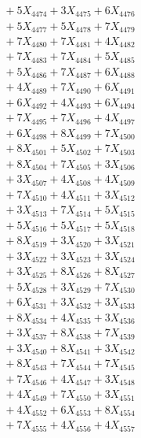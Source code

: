 \documentclass[a4paper,10pt]{article}
\begin{document}
{\begin{align}
&\;  + 5 X_{4474} + 3 X_{4475} + 6 X_{4476} \\[0.3ex]
&\;  + 5 X_{4477} + 5 X_{4478} + 7 X_{4479} \\[0.5ex]\allowbreak
&\;  + 7 X_{4480} + 7 X_{4481} + 4 X_{4482} \\[0.3ex]
&\;  + 7 X_{4483} + 7 X_{4484} + 5 X_{4485} \\[0.3ex]
&\;  + 5 X_{4486} + 7 X_{4487} + 6 X_{4488} \\[0.3ex]
&\;  + 4 X_{4489} + 7 X_{4490} + 6 X_{4491} \\[0.3ex]
&\;  + 6 X_{4492} + 4 X_{4493} + 6 X_{4494} \\[0.3ex]
&\;  + 7 X_{4495} + 7 X_{4496} + 4 X_{4497} \\[0.3ex]
&\;  + 6 X_{4498} + 8 X_{4499} + 7 X_{4500} \\[0.3ex]
&\;  + 8 X_{4501} + 5 X_{4502} + 7 X_{4503} \\[0.3ex]
&\;  + 8 X_{4504} + 7 X_{4505} + 3 X_{4506} \\[0.3ex]
&\;  + 3 X_{4507} + 4 X_{4508} + 4 X_{4509} \\[0.5ex]\allowbreak
&\;  + 7 X_{4510} + 4 X_{4511} + 3 X_{4512} \\[0.3ex]
&\;  + 3 X_{4513} + 7 X_{4514} + 5 X_{4515} \\[0.3ex]
&\;  + 5 X_{4516} + 5 X_{4517} + 5 X_{4518} \\[0.3ex]
&\;  + 8 X_{4519} + 3 X_{4520} + 3 X_{4521} \\[0.3ex]
&\;  + 3 X_{4522} + 3 X_{4523} + 3 X_{4524} \\[0.3ex]
&\;  + 3 X_{4525} + 8 X_{4526} + 8 X_{4527} \\[0.3ex]
&\;  + 5 X_{4528} + 3 X_{4529} + 7 X_{4530} \\[0.3ex]
&\;  + 6 X_{4531} + 3 X_{4532} + 3 X_{4533} \\[0.3ex]
&\;  + 8 X_{4534} + 4 X_{4535} + 3 X_{4536} \\[0.3ex]
&\;  + 3 X_{4537} + 8 X_{4538} + 7 X_{4539} \\[0.5ex]\allowbreak
&\;  + 3 X_{4540} + 8 X_{4541} + 3 X_{4542} \\[0.3ex]
&\;  + 8 X_{4543} + 7 X_{4544} + 7 X_{4545} \\[0.3ex]
&\;  + 7 X_{4546} + 4 X_{4547} + 3 X_{4548} \\[0.3ex]
&\;  + 4 X_{4549} + 7 X_{4550} + 3 X_{4551} \\[0.3ex]
&\;  + 4 X_{4552} + 6 X_{4553} + 8 X_{4554} \\[0.3ex]
&\;  + 7 X_{4555} + 4 X_{4556} + 4 X_{4557} \\[0.3ex]

\end{align}}
\end{document}
